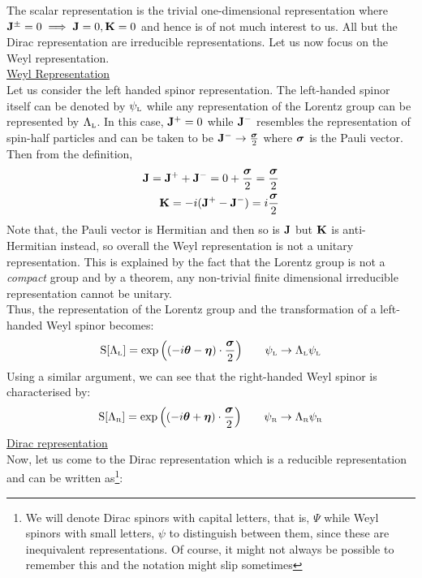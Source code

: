 The scalar representation is the trivial one-dimensional representation where $\vb{J}^{\pm} = 0 \implies \vb{J}=0, \vb{K} = 0$ and hence is of not much interest to us. All but the Dirac representation are irreducible representations. Let us now focus on the Weyl representation. \\[0.2cm]
\underline{Weyl Representation}\\[0.2cm]
Let us consider the left handed spinor representation. The left-handed spinor itself can be denoted by $\psi_{\text{\tiny L}}$ while any representation of the Lorentz group can be represented by $\Lambda_{\text{\tiny L}}$. In this case, 
$\vb{J}^{+} =0$ while $\vb{J}^{-}$ resembles the representation of spin-half particles and can be taken to be $\vb{J}^{-}\to \frac{\boldsymbol{\sigma}}{2}$ where $\boldsymbol{\sigma}$ is the Pauli vector. Then from the definition, 
\begin{align*}
    \vb{J} = \vb{J}^+ + \vb{J}^{-} = 0 + \frac{\boldsymbol{\sigma}}{2} = \frac{\boldsymbol{\sigma}}{2}\\
    \vb{K} = -i ( \vb{J}^+ - \vb{J}^{-}) = i  \frac{\boldsymbol{\sigma}}{2}
\end{align*}
Note that, the Pauli vector is Hermitian and then so is $\vb{J}$ but  $\vb{K}$ is anti-Hermitian instead, so overall the Weyl representation is not a unitary representation. This is explained by the fact that the Lorentz group is not a \textit{compact} group and by a theorem, any non-trivial finite dimensional irreducible representation cannot be unitary. \\[0.2cm]
Thus, the representation of the Lorentz group and the transformation of a left-handed Weyl spinor becomes:
$$\mathrm{S}[\Lambda_{\text{\tiny L}}] = \exp \qty((-i\boldsymbol{\theta} -\boldsymbol{\eta} )\cdot \frac{\boldsymbol{\sigma}}{2})\qquad \psi_{\text{\tiny L}} \to \Lambda_{\text{\tiny L}}\psi_{\text{\tiny L}} $$
Using a similar argument, we can see that the right-handed Weyl spinor is characterised by:
$$\mathrm{S}[\Lambda_{\text{\tiny R}}] = \exp \qty((-i\boldsymbol{\theta} +\boldsymbol{\eta} )\cdot \frac{\boldsymbol{\sigma}}{2})\qquad \psi_{\text{\tiny R}} \to \Lambda_{\text{\tiny R}}\psi_{\text{\tiny R}} $$
\underline{Dirac representation}\label{sec:diracspin}\\[0.23cm]
Now, let us come to the Dirac representation which is a reducible representation and can be written as\footnote{We will denote Dirac spinors with capital letters, that is, $\Psi$ while Weyl spinors with small letters, $\psi$ to distinguish between them, since these are inequivalent representations. Of course, it might not always be possible to remember this and the notation might slip sometimes }:
